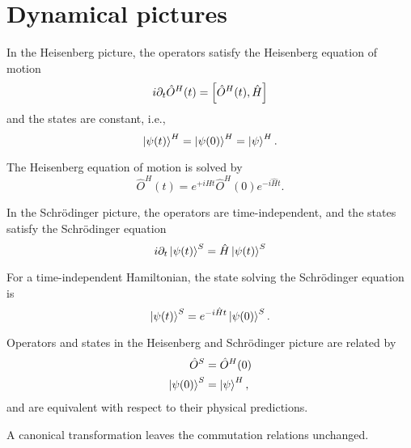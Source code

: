 \section{Dynamical pictures}

\begin{definition}
	In the Heisenberg picture, the operators satisfy the Heisenberg equation of motion
	\begin{equation}
		i\partial_t
		\hat{O}^H(t)
		=
		\comm{\hat{O}^H(t)}{\hat{H}}
	\end{equation}
	and the states are constant, i.e.,
	\begin{equation}
		\ket{\psi(t)}^H
		=
		\ket{\psi(0)}^H
		=
		\ket{\psi}^H
		.
	\end{equation}
\end{definition}
\begin{lemma}\label{thm:heisenberg_eom_sol}
	The Heisenberg equation of motion is solved by
	\begin{equation}
		\hat{O}^H(t)
		=
		e^{+i\hat{H}t}
		\hat{O}^H(0)
		e^{-i\hat{H}t}
		.
	\end{equation}
\end{lemma}
\begin{definition}
	In the Schrödinger picture, the operators are time-independent, and the states satisfy the Schrödinger equation
	\begin{equation}
		i\partial_t
		\ket{\psi(t)}^S
		=
		\hat{H}
		\ket{\psi(t)}^S
	\end{equation}
\end{definition}
\begin{lemma}\label{thm:schroedinger_eom_sol}
	For a time-independent Hamiltonian, the state solving the Schrödinger equation is
	\begin{equation}
		\ket{\psi(t)}^S
		=
		e^{-i\hat{H}t}
		\ket{\psi(0)}^S
		.
	\end{equation}
\end{lemma}
\begin{theorem}\label{thm:heisenberg_schroedinger_equivalence}
	Operators and states in the Heisenberg and Schrödinger picture are related by
	\begin{align}
		\hat{O}^S
		&=
		\hat{O}^H(0)
		\\
		\ket{\psi(0)}^S
		&=
		\ket{\psi}^H
		,
	\end{align}
	and are equivalent with respect to their physical predictions.
\end{theorem}
\begin{definition}
	A canonical transformation leaves the commutation relations unchanged.	
\end{definition}
